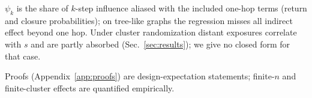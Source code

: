 $\psi_k$ is the share of $k$-step influence aliased with the included one-hop terms (return and closure probabilities); on tree-like graphs the regression misses all indirect effect beyond one hop. Under cluster randomization distant exposures correlate with $s$ and are partly absorbed (Sec.~\ref{sec:results}); we give no closed form for that case.

Proofs (Appendix~\ref{app:proofs}) are design-expectation statements; finite-$n$ and finite-cluster effects are quantified empirically.
